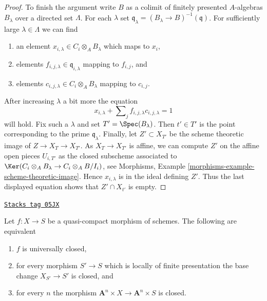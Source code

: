 \begin{proof}
\medskip\noindent
To finish the argument write $B$ as a colimit of finitely presented
$A$-algebras $B_\lambda$ over a directed set $\Lambda$.
For each $\lambda$ set
$\mathfrak q_\lambda = (B_\lambda \to B)^{-1}(\mathfrak q)$.
For sufficiently large $\lambda \in \Lambda$ we can find
\begin{enumerate}
\item an element
$x_{i, \lambda} \in C_i \otimes_A B_\lambda$ which maps to $x_i$,
\item elements $f_{i, j, \lambda} \in \mathfrak q_{i, \lambda}$
mapping to $f_{i, j}$, and
\item elements $c_{i, j, \lambda} \in C_i \otimes_A B_\lambda$
mapping to $c_{i, j}$.
\end{enumerate}
After increasing $\lambda$ a bit more the equation
$$
x_{i, \lambda} + \sum\nolimits_j f_{i, j, \lambda}c_{i, j, \lambda} = 1
$$
will hold. Fix such a $\lambda$ and set $T' = \Spec(B_\lambda)$.
Then $t' \in T'$ is the point corresponding to the prime $\mathfrak q_\lambda$.
Finally, let $Z' \subset X_{T'}$ be the scheme theoretic image of
$Z \to X_T \to X_{T'}$. As $X_T \to X_{T'}$ is affine, we can compute $Z'$
on the affine open pieces $U_{i, T'}$ as the closed subscheme associated
to $\Ker(C_i \otimes_A B_\lambda \to C_i \otimes_A B/I_i)$, see
Morphisms, Example \ref{morphisms-example-scheme-theoretic-image}.
Hence $x_{i, \lambda}$ is in the ideal defining $Z'$. Thus the last
displayed equation shows that $Z' \cap X_{t'}$ is empty.
\end{proof}

\begin{lemma}
\label{limits-lemma-test-universally-closed}
\href{https://stacks.math.columbia.edu/tag/05JX}{\texttt{Stacks tag 05JX}}

Let $f : X \to S$ be a quasi-compact morphism of schemes.
The following are equivalent
\begin{enumerate}
\item $f$ is universally closed,
\item for every morphism $S' \to S$ which is locally of finite presentation
the base change $X_{S'} \to S'$ is closed, and
\item for every $n$ the morphism
$\mathbf{A}^n \times X \to \mathbf{A}^n \times S$
is closed.
\end{enumerate}
\end{lemma}

